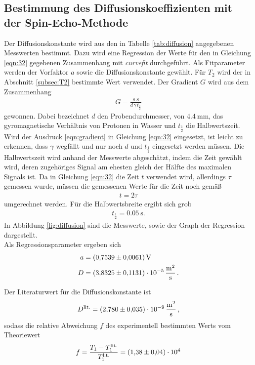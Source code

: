 \subsection{Bestimmung des Diffusionskoeffizienten mit der Spin-Echo-Methode}
\label{subsec:D}
Der Diffusionskonstante wird aus den in Tabelle \ref{tab:diffusion} angegebenen
Messwerten bestimmt.
Dazu wird eine Regression der Werte für den in Gleichung \eqref{eqn:32} gegebenen Zusammenhang mit
\textit{curvefit} durchgeführt.
Als Fitparameter werden der Vorfaktor $a$ sowie die Diffusionskonstante gewählt. Für $T_{2}$ wird der in Abschnitt
\ref{subsec:T2} bestimmte Wert verwendet. Der Gradient $G$ wird aus dem Zusammenhang
\begin{align}
  \label{eqn:gradient}
  G = \frac{8.8}{d \, \gamma \, t_{\frac{1}{2}}}
\end{align}
gewonnen. Dabei bezeichnet $d$ den Probendurchmesser, von $\SI{4.4}{\milli\meter}$, \gamma das gyromagnetische Verhältnis
von Protonen in Wasser und $t_{\frac{1}{2}}$ die Halbwertszeit.
Wird der Ausdruck \eqref{eqn:gradient} in Gleichung \eqref{eqn:32} eingesetzt, ist leicht zu erkennen, dass $\gamma$ wegfällt und nur noch $d$ und $t_{\frac{1}{2}}$ eingesetzt werden müssen.
Die Halbwertszeit wird anhand der Messwerte abgeschätzt, indem die Zeit gewählt wird, deren zugehöriges Signal am ehesten
gleich der Hälfte des maximalen Signals ist.
Da in Gleichung \eqref{eqn:32} die Zeit $t$ verwendet wird, allerdings $\tau$ gemessen wurde, müssen
die gemessenen Werte für die Zeit noch gemäß
\begin{align}
  t = 2 \tau
\end{align}
umgerechnet werden.
Für die Halbwertsbreite ergibt sich grob
\begin{align*}
  t_{\frac{1}{2}} = \SI{0.05}{\second}.
\end{align*}
In Abbildung \ref{fig:diffusion} sind die Messwerte, sowie der Graph der Regression dargestellt.\\
Als Regressionsparameter ergeben sich
\begin{align*}
  a &= \SI{0.7539+-0.0061}{\volt}\\
  D &= \SI{3.8325+-0.1131 e-5}{\meter\squared\per\second} \, .
\end{align*}

Der Literaturwert\cite{litwerte} für die Diffusionskonstante ist
\begin{align*}
  D^\text{lit.} = \SI{2.78+-0.035 e-9}{\meter\squared\per\second} \, ,
\end{align*}
sodass die relative Abweichung $f$ des experimentell bestimmten Werts
vom Theoriewert
\begin{align*}
  f = \frac{T_{1} - T_{1}^\text{lit.}}{T_{1}^\text{lit.}} = \SI{1.38+-0.04 e4}{}
\end{align*}


